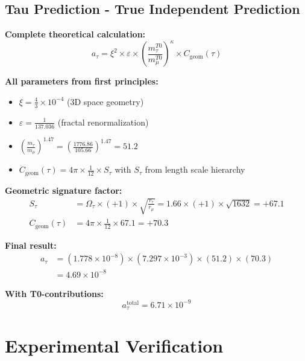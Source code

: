 \documentclass[12pt,a4paper]{article}
\numberwithin{equation}{section}
\newcommand{\xipar}{\xi}
\newcommand{\epsilonT}{\varepsilon}
\newcommand{\Cgeom}{C_{\text{geom}}}
\newcommand{\kappaT}{\kappa}
\newcommand{\Omegafactor}{\Omega}
\begin{document}
	\subsection{Tau Prediction - True Independent Prediction}
	
	\textbf{Complete theoretical calculation:}
	\begin{equation}
		a_\tau = \xipar^2 \times \epsilonT \times \left(\frac{m_\tau^{T0}}{m_\mu^{T0}}\right)^{\kappaT} \times \Cgeom(\tau)
		\label{eq:tau_formula}
	\end{equation}
	
	\textbf{All parameters from first principles:}
	\begin{itemize}
		\item $\xipar = \frac{4}{3} \times 10^{-4}$ (3D space geometry)
		\item $\epsilonT = \frac{1}{137.036}$ (fractal renormalization)
		\item $\left(\frac{m_\tau}{m_\mu}\right)^{1.47} = \left(\frac{1776.86}{105.66}\right)^{1.47} = 51.2$
		\item $\Cgeom(\tau) = 4\pi \times \frac{1}{12} \times S_\tau$ with $S_\tau$ from length scale hierarchy
	\end{itemize}
	
	\textbf{Geometric signature factor:}
	\begin{align}
		S_\tau &= \Omegafactor_\tau \times (+1) \times \sqrt{\frac{r_\tau}{r_\mu}} = 1.66 \times (+1) \times \sqrt{1632} = +67.1\\
		\Cgeom(\tau) &= 4\pi \times \frac{1}{12} \times 67.1 = +70.3
		\label{eq:tau_signature}
	\end{align}
	
	\textbf{Final result:}
	\begin{align}
		a_\tau &= (1.778 \times 10^{-8}) \times (7.297 \times 10^{-3}) \times (51.2) \times (70.3)\\
		&= 4.69 \times 10^{-8}
		\label{eq:tau_basic}
	\end{align}
	
	\textbf{With T0-contributions:}
	\begin{equation}
		a_\tau^{\text{total}} = 6.71 \times 10^{-9}
		\label{eq:tau_total}
	\end{equation}
	
	\section{Experimental Verification}
	
\end{document}
